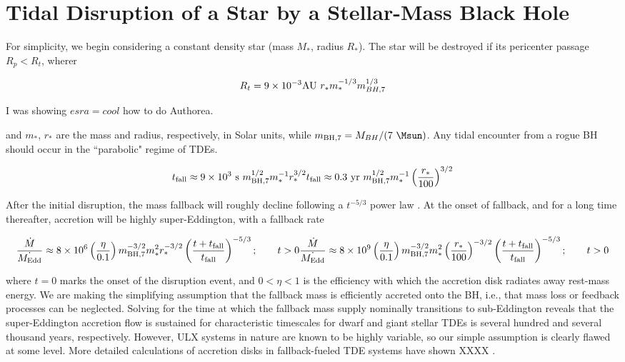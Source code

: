 \section{Tidal Disruption of a Star by a Stellar-Mass Black Hole}\label{section:general}


For simplicity, we begin considering a constant density star (mass $M_*$, radius $R_*$).  The star will be destroyed if its pericenter passage $R_p < R_t$, wherer

\begin{equation}
R_t = 9 \times 10^{-3} {\rm AU}~ r_{*} m_{*}^{-1/3} m_{BH,7}^{1/3}
\end{equation}

I was showing $esra=cool$ how to do Authorea.

and $m_*$, $r_*$ are the mass and radius, respectively, in Solar units, while $m_{{\rm BH},7} = M_{BH}/(7~\Msun)$.  Any tidal encounter from a rogue BH should occur in the ``parabolic" regime of TDEs.   

\begin{equation}
t_{\rm fall} \approx 9 \times 10^3~{\rm s}~m_{{\rm BH},7}^{1/2}m_{*}^{-1}r_{*}^{3/2}\\
t_{\rm fall} \approx 0.3~{\rm yr}~m_{{\rm BH},7}^{1/2}m_{*}^{-1}\left(\frac{r_{*}}{100}\right)^{3/2}
\end{equation}

After the initial disruption, the mass fallback will roughly decline following a $t^{-5/3}$ power law \citep{Rees_1988}. At the onset of fallback, and for a long time thereafter, accretion will be highly super-Eddington, with a fallback rate

\begin{equation}
\frac{\dot{M}}{\dot{M_{\rm Edd}}} \approx 8 \times 10^{6} \left(\frac{\eta}{0.1}\right)m_{\rm BH,7}^{-3/2}m_{*}^{2}r_*^{-3/2} \left(\frac{t+t_{\rm fall}}{t_{\rm fall}}\right)^{-5/3}; \qquad t > 0 \\
\frac{\dot{M}}{\dot{M_{\rm Edd}}} \approx 8 \times 10^{9} \left(\frac{\eta}{0.1}\right)m_{\rm BH,7}^{-3/2}m_{*}^{2}\left(\frac{r_*}{100}\right)^{-3/2} \left(\frac{t+t_{\rm fall}}{t_{\rm fall}}\right)^{-5/3}; \qquad t > 0
\end{equation}

where $t=0$ marks the onset of the disruption event, and $0 < \eta < 1$ is the efficiency with which the accretion disk radiates away rest-mass energy.  We are making the simplifying assumption that the fallback mass is efficiently accreted onto the BH, i.e., that mass loss or feedback processes can be neglected.  Solving for the time at which the fallback mass supply nominally transitions to sub-Eddington reveals that the super-Eddington accretion flow is sustained for characteristic timescales for dwarf and giant stellar TDEs is several hundred and several thousand years, respectively.  
However, ULX systems in nature are known to be highly variable, so our simple assumption is clearly flawed at some level.   More detailed calculations of accretion disks in fallback-fueled TDE systems have shown XXXX \citep{Shen_2014,Coughlin_2014}.   

